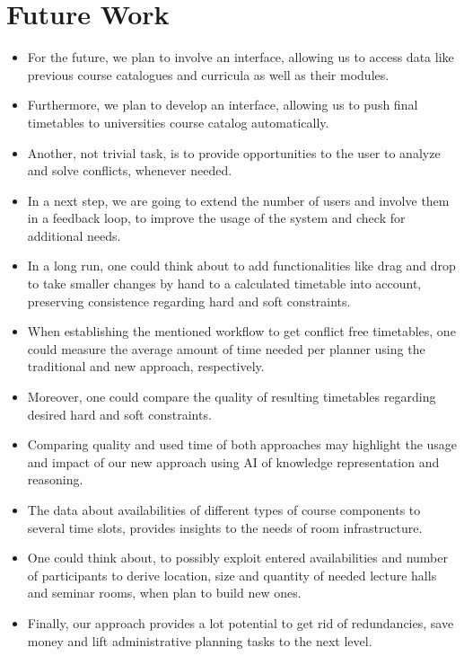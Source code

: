 \documentclass{easychair}
\begin{document}


\section{Future Work}
\label{sec:future}
\begin{itemize}%
  \item%
  For the future, we plan to involve an interface, allowing us to access data like previous course catalogues and curricula as well as their modules.
  \item%
  Furthermore, we plan to develop an interface, allowing us to push final timetables to universities course catalog automatically. 
  \item%
  Another, not trivial task, is to provide opportunities to the user to analyze and solve conflicts, whenever needed.  
  \item%
  In a next step, we are going to extend the number of users and involve them in a feedback loop, to improve the usage of the system and check for additional needs. 
  \item%
  In a long run, one could think about to add functionalities like drag and drop to take smaller changes by hand to a calculated timetable into account, preserving consistence regarding hard and soft constraints. 
  \item%
  When establishing the mentioned workflow to get conflict free timetables, one could measure the average amount of time needed per planner using the traditional and new approach, respectively.
  \item%
  Moreover, one could compare the quality of resulting timetables regarding desired hard and soft constraints. 
  \item%
  Comparing quality and used time of both approaches may highlight the usage and impact of our new approach using AI of knowledge representation and reasoning. 
  \item%
  The data about availabilities of different types of course components to several time slots, provides insights to the needs of room infrastructure. 
  \item%
  One could think about, to possibly exploit entered availabilities and number of participants to derive location, size and quantity of needed lecture halls and seminar rooms, when plan to build new ones.
  \item%
  Finally, our approach provides a lot potential to get rid of redundancies, save money and lift administrative planning tasks to the next level. 
\end{itemize}%
\end{document}
